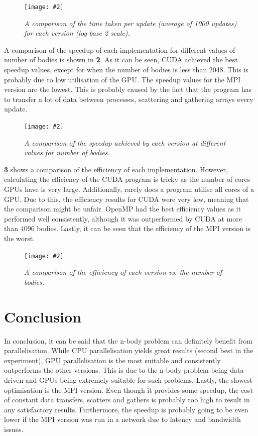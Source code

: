 \documentclass[12pt, a4paper]{article}
\newcommand{\figuremacro}[5]{
    \begin{figure}[#1]
        \centering
        \caption[#3]{\textbf{#3}#4}
        \texttt{[image: \#2]}
        \label{fig:#2}
    \end{figure}
}
\begin{document}
    \figuremacro{h}{avg_times}{}{\small{\textit{A comparison of the time taken per update (average of 1000 updates) for each version (log base 2 scale).}}}{1}    

    A comparison of the speedup of each implementation for different values of number of bodies is shown in \textbf{\cref{fig:speedup}}. As it can be seen, CUDA achieved the best speedup values, except for when the number of bodies is less than 2048. This is probably due to low utilisation of the GPU. The speedup values for the MPI version are the lowest. This is probably caused by the fact that the program has to transfer a lot of data between processes, scattering and gathering arrays every update.

    \figuremacro{h}{speedup}{}{\small{\textit{A comparison of the speedup achieved by each version at different values for number of bodies.}}}{1}    

    \textbf{\cref{fig:efficiency}} shows a comparison of the efficiency of each implementation. However, calculating the efficiency of the CUDA program is tricky as the number of cores GPUs have is very large. Additionally, rarely does a program utilise all cores of a GPU. Due to this, the efficiency results for CUDA were very low, meaning that the comparison might be unfair. OpenMP had the best efficiency values as it performed well consistently, although it was outperformed by CUDA at more than 4096 bodies. Lastly, it can be seen that the efficiency of the MPI version is the worst.

    \figuremacro{h}{efficiency}{}{\small{\textit{A comparison of the efficiency of each version vs. the number of bodies.}}}{1}

    \section{Conclusion}
    In conclusion, it can be said that the n-body problem can definitely benefit from parallelisation. While CPU parallelisation yields great results (second best in the experiment), GPU parallelisation is the most suitable and consistently outperforms the other versions. This is due to the n-body problem being data-driven and GPUs being extremely suitable for such problems. Lastly, the slowest optimisation is the MPI version. Even though it provides some speedup, the cost of constant data transfers, scatters and gathers is probably too high to result in any satisfactory results. Furthermore, the speedup is probably going to be even lower if the MPI version was run in a network due to latency and bandwidth issues. 
\end{document}
